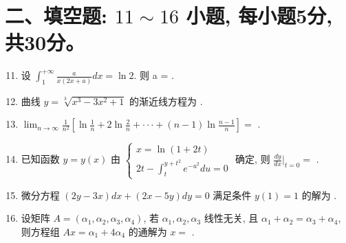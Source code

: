 \documentclass[UTF8]{ctexart}
\begin{document}
\section*{二、填空题: $11\sim16$ 小题, 每小题5分, 共30分。}
\begin{enumerate}
    \setcounter{enumi}{10}

    \item 设 $\int_{1}^{+\infty}\frac{a}{x(2x+a)}dx=\ln 2$. 则 a = \underline{\hspace{3cm}}.
    
    \item 曲线 $y=\sqrt[3]{x^{3}-3x^{2}+1}$ 的渐近线方程为 \underline{\hspace{3cm}}.

    \item $\lim_{n\rightarrow\infty}\frac{1}{n^{2}}[\ln\frac{1}{n}+2\ln\frac{2}{n}+\cdot\cdot\cdot+(n-1)\ln\frac{n-1}{n}]=$ \underline{\hspace{3cm}}.

    \item 已知函数 $y=y(x)$ 由 $\begin{cases}x=\ln(1+2t)\\ 2t-\int_{t}^{y+t^{2}}e^{-u^{2}}du=0\end{cases}$ 确定, 则 $\frac{dy}{dx}|_{t=0}=$ \underline{\hspace{3cm}}.

    \item 微分方程 $(2y-3x)dx+(2x-5y)dy=0$ 满足条件 $y(1)=1$ 的解为 \underline{\hspace{3cm}}.

    \item 设矩阵 $A=(\alpha_{1},\alpha_{2},\alpha_{3},\alpha_{4})$, 若 $\alpha_{1},\alpha_{2},\alpha_{3}$ 线性无关, 且 $\alpha_{1}+\alpha_{2}=\alpha_{3}+\alpha_{4}$, 则方程组 $Ax=\alpha_{1}+4\alpha_{4}$ 的通解为 $x=$ \underline{\hspace{3cm}}.
\end{enumerate}
\end{document}
